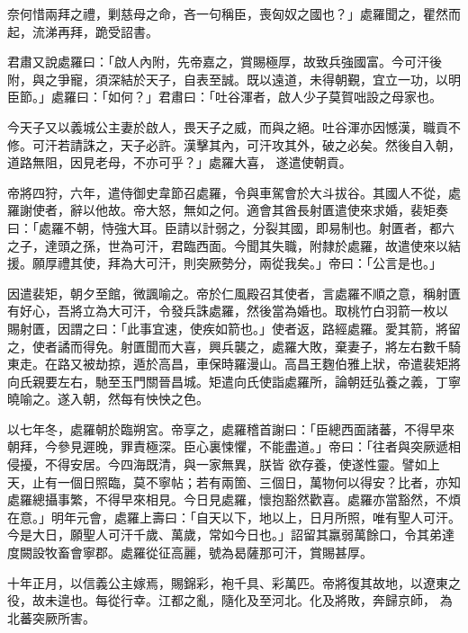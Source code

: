 \begin{pinyinscope}
 奈何惜兩拜之禮，剿慈母之命，吝一句稱臣，喪匈奴之國也？」處羅聞之，瞿然而起，流涕再拜，跪受詔書。



 君肅又說處羅曰：「啟人內附，先帝嘉之，賞賜極厚，故致兵強國富。今可汗後附，與之爭寵，須深結於天子，自表至誠。既以遠道，未得朝覲，宜立一功，以明臣節。」處羅曰：「如何？」君肅曰：「吐谷渾者，啟人少子莫賀咄設之母家也。



 今天子又以義城公主妻於啟人，畏天子之威，而與之絕。吐谷渾亦因憾漢，職貢不修。可汗若請誅之，天子必許。漢擊其內，可汗攻其外，破之必矣。然後自入朝，道路無阻，因見老母，不亦可乎？」處羅大喜，
 遂遣使朝貢。



 帝將四狩，六年，遣侍御史韋節召處羅，令與車駕會於大斗拔谷。其國人不從，處羅謝使者，辭以他故。帝大怒，無如之何。適會其酋長射匱遣使來求婚，裴矩奏曰：「處羅不朝，恃強大耳。臣請以計弱之，分裂其國，即易制也。射匱者，都六之子，達頭之孫，世為可汗，君臨西面。今聞其失職，附隸於處羅，故遣使來以結援。願厚禮其使，拜為大可汗，則突厥勢分，兩從我矣。」帝曰：「公言是也。」



 因遣裴矩，朝夕至館，微諷喻之。帝於仁風殿召其使者，言處羅不順之意，稱射匱有好心，吾將立為大可汗，令發兵誅處羅，然後當為婚也。取桃竹白羽箭一枚以
 賜射匱，因謂之曰：「此事宜速，使疾如箭也。」使者返，路經處羅。愛其箭，將留之，使者譎而得免。射匱聞而大喜，興兵襲之，處羅大敗，棄妻子，將左右數千騎東走。在路又被劫掠，遁於高昌，車保時羅漫山。高昌王麴伯雅上狀，帝遣裴矩將向氏親要左右，馳至玉門關晉昌城。矩遣向氏使詣處羅所，論朝廷弘養之義，丁寧曉喻之。遂入朝，然每有怏怏之色。



 以七年冬，處羅朝於臨朔宮。帝享之，處羅稽首謝曰：「臣總西面諸蕃，不得早來朝拜，今參見遲晚，罪責極深。臣心裏悚懼，不能盡道。」帝曰：「往者與突厥遞相侵擾，不得安居。今四海既清，與一家無異，朕皆
 欲存養，使遂性靈。譬如上天，止有一個日照臨，莫不寧帖；若有兩箇、三個日，萬物何以得安？比者，亦知處羅總攝事繁，不得早來相見。今日見處羅，懷抱豁然歡喜。處羅亦當豁然，不煩在意。」明年元會，處羅上壽曰：「自天以下，地以上，日月所照，唯有聖人可汗。今是大日，願聖人可汗千歲、萬歲，常如今日也。」詔留其羸弱萬餘口，令其弟達度闕設牧畜會寧郡。處羅從征高麗，號為曷薩那可汗，賞賜甚厚。



 十年正月，以信義公主嫁焉，賜錦彩，袍千具、彩萬匹。帝將復其故地，以遼東之役，故未遑也。每從行幸。江都之亂，隨化及至河北。化及將敗，奔歸京師，
 為北蕃突厥所害。




\end{pinyinscope}
